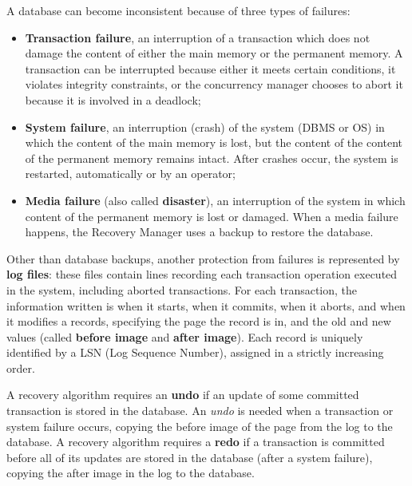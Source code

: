 A database can become inconsistent because of three types of failures:
\begin{itemize}
    \item \textbf{Transaction failure}, an interruption of a transaction which does not damage the content of either the main memory or the permanent memory. A transaction can be interrupted because either it meets certain conditions, it violates integrity constraints, or the concurrency manager chooses to abort it because it is involved in a deadlock;
    
    \item \textbf{System failure}, an interruption (crash) of the system (DBMS or OS) in which the content of the main memory is lost, but the content of the content of the permanent memory remains intact. After crashes occur, the system is restarted, automatically or by an operator;
    
    \item \textbf{Media failure} (also called \textbf{disaster}), an interruption of the system in which content of the permanent memory is lost or damaged. When a media failure happens, the Recovery Manager uses a backup to restore the database.
\end{itemize}
Other than database backups, another protection from failures is represented by \textbf{log files}: these files contain lines recording each transaction operation executed in the system, including aborted transactions. For each transaction, the information written is when it starts, when it commits, when it aborts, and when it modifies a records, specifying the page the record is in, and the old and new values (called \textbf{before image} and \textbf{after image}). Each record is uniquely identified by a LSN (Log Sequence Number), assigned in a strictly increasing order.

A recovery algorithm requires an \textbf{undo} if an update of some committed transaction is stored in the database. An \textit{undo} is needed when a transaction or system failure occurs, copying the before image of the page from the log to the database. A recovery algorithm requires a \textbf{redo} if a transaction is committed before all of its updates are stored in the database (after a system failure), copying the after image in the log to the database.

